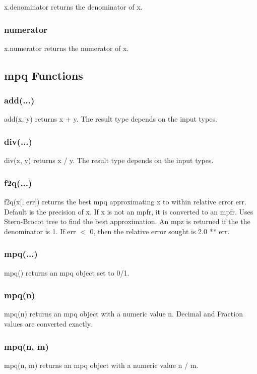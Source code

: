 x.denominator returns the denominator of x.

\subsubsection{numerator}

x.numerator returns the numerator of x.


\subsection{mpq Functions}

\subsubsection{add(...)}

add(x, y) returns x + y. The result type depends on the input types.

\subsubsection{div(...)}

div(x, y) returns x / y. The result type depends on the input types.

\subsubsection{f2q(...)}

f2q(x[, err]) returns the best mpq approximating x to within relative error err. Default is the precision of x. If x is not an mpfr, it is converted to an mpfr. Uses Stern-Brocot tree to find the best approximation. An mpz is returned if the the denominator is 1. If err $<$ 0, then the relative error sought is 2.0 ** err.

\subsubsection{mpq(...)}

mpq() returns an mpq object set to 0/1.

\subsubsection{mpq(n)}
mpq(n) returns an mpq object with a numeric value n. Decimal and Fraction values are
converted exactly.

\subsubsection{mpq(n, m)}
mpq(n, m) returns an mpq object with a numeric value n / m.

